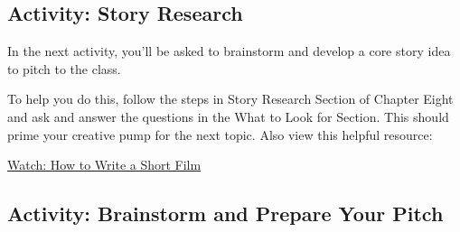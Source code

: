 \documentclass[
]{book}
\begin{document}
\hypertarget{activity-story-research}{%
\subsection*{Activity: Story Research}\label{activity-story-research}}

\begin{reflect}
In the next activity, you'll be asked to brainstorm and develop a core story idea to pitch to the class.

To help you do this, follow the steps in Story Research Section of Chapter Eight and ask and answer the questions in the What to Look for Section. This should prime your creative pump for the next topic. Also view this helpful resource:

\href{https://www.youtube.com/watch?v=wMqIQcTMlA0}{Watch: How to Write a Short Film}
\end{reflect}

\hypertarget{activity-brainstorm-and-prepare-your-pitch}{%
\subsection*{Activity: Brainstorm and Prepare Your Pitch}\label{activity-brainstorm-and-prepare-your-pitch}}
\end{document}
